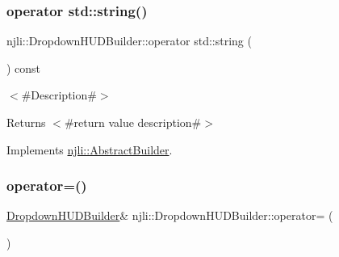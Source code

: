 \subsubsection{\texorpdfstring{operator std\+::string()}{operator std::string()}}
{\footnotesize\ttfamily njli\+::\+Dropdown\+H\+U\+D\+Builder\+::operator std\+::string (\begin{DoxyParamCaption}{ }\end{DoxyParamCaption}) const\hspace{0.3cm}{\ttfamily [virtual]}}

$<$\#\+Description\#$>$

\begin{DoxyReturn}{Returns}
$<$\#return value description\#$>$ 
\end{DoxyReturn}


Implements \mbox{\hyperlink{classnjli_1_1_abstract_builder_a3e6e553e06d1ca30517ad5fb0bd4d000}{njli\+::\+Abstract\+Builder}}.

\mbox{\label{classnjli_1_1_dropdown_h_u_d_builder_ab694e3c60c07c5cf4559099fdf14c4cb}} 
\subsubsection{\texorpdfstring{operator=()}{operator=()}}
{\footnotesize\ttfamily \mbox{\hyperlink{classnjli_1_1_dropdown_h_u_d_builder}{Dropdown\+H\+U\+D\+Builder}}\& njli\+::\+Dropdown\+H\+U\+D\+Builder\+::operator= (\begin{DoxyParamCaption}\item[{const \mbox{\hyperlink{classnjli_1_1_dropdown_h_u_d_builder}{Dropdown\+H\+U\+D\+Builder}} \&}]{ }\end{DoxyParamCaption})\hspace{0.3cm}{\ttfamily [protected]}}

\mbox{\label{classnjli_1_1_dropdown_h_u_d_builder_a969af945e0761935c8fd729274fc70aa}} 
